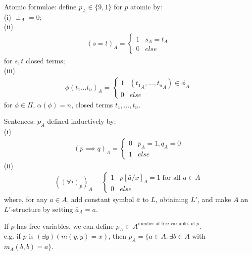 \documentclass[a4paper]{article}
\begin{document}
Atomic formulae: define $p_A \in \{9,1\}$ for $p$ atomic by:\\
(i) $\perp_A = 0$;\\
(ii) 
\begin{equation*}
\begin{aligned}
(s=t)_A = \left\{\begin{array}{ll}
1 & s_A = t_A\\
0 & else
\end{array}
\right.
\end{aligned}
\end{equation*}
for $s,t$ closed terms;\\
(iii) 
\begin{equation*}
\begin{aligned}
\phi(t_1...t_n)_A = \left\{\begin{array}{ll}
1 & ({t_1}_A,...,{t_n}_A) \in \phi_A\\
0 & else
\end{array}
\right.
\end{aligned}
\end{equation*}
for $\phi \in \Pi$, $\alpha(\phi) = n$, closed terms $t_1,...,t_n$.

Sentences: $p_A$ defined inductively by:\\
(i)
\begin{equation*}
\begin{aligned}
(p \implies q)_A =\left\{\begin{array}{ll}
0 & p_A=1,q_A=0\\
1 & else
\end{array}
\right.
\end{aligned}
\end{equation*}
(ii)
\begin{equation*}
\begin{aligned}
((\forall i)_p)_A =\left\{\begin{array}{ll}
1 & p[\bar{a}/x]_A = 1 \text{ for all } a \in A\\
0 & else
\end{array}
\right.
\end{aligned}
\end{equation*}
where, for any $a \in A$, add constant symbol $\bar{a}$ to $L$, obtaining $L'$, and make $A$ an $L'$-structure by setting $\bar{a}_A = a$.

If $p$ has free variables, we can define $p_A \subset A^{\text{number of free variables of } p}$.\\
e.g. if $p$ is $(\exists y)(m(y,y) = x)$, then $p_A = \{a \in A: \exists b \in A$ with $m_A(b,b) = a\}$.
\iffalse
\begin{equation*}
\begin{aligned}

\end{aligned}
\end{equation*}
\fi
\end{document}
